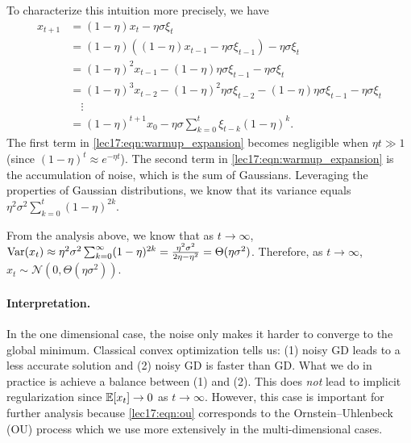 To characterize this intuition more precisely, we have 
\begin{align}
x_{t+1} &= (1 - \eta)x_t - \eta\sigma\xi_t\\
&= (1 - \eta) ((1 - \eta) x_{t - 1}  - \eta \sigma \xi_{t - 1}) - \eta \sigma \xi_t \\
&= (1 - \eta)^2 x_{t - 1} - (1 - \eta) \eta \sigma \xi_{t - 1} - \eta \sigma \xi_{t} \\
&= (1 - \eta)^3 x_{t - 2} - (1 - \eta)^2 \eta \sigma \xi_{t - 2} - (1 - \eta) \eta \sigma \xi_{t - 1} - \eta \sigma \xi_t \\
&\quad \vdots \\
&= (1 - \eta)^{t+1} x_0 - \eta\sigma\sum_{k=0}^{t} \xi_{t-k} (1 - \eta)^{k}. \label{lec17:eqn:warmup_expansion}
\end{align}
The first term in \eqref{lec17:eqn:warmup_expansion} becomes negligible when $\eta t \gg 1$ (since $(1 - \eta)^{t} \approx e^{-\eta t}$). The second term in \eqref{lec17:eqn:warmup_expansion} is the accumulation of noise, which is the sum of Gaussians. Leveraging the properties of Gaussian distributions, we know that its variance equals $\eta^2\sigma^2\sum_{k=0}^{t} (1 - \eta)^{2k}$.

From the analysis above, we know that as $t \rightarrow \infty$, $\operatorname{Var}(x_t) \approx \eta^2\sigma^2\sum_{k=0}^{\infty} (1 - \eta)^{2k} = \frac{\eta^2\sigma^2}{2\eta - \eta^2} = {\Theta}(\eta\sigma^2)$. Therefore, as $t \rightarrow \infty$, $x_t \sim \mathcal{N}(0, {\Theta}(\eta\sigma^2))$.

\paragraph{Interpretation.} In the one dimensional case, the noise only makes it harder to converge to the global minimum. Classical convex optimization tells us: (1) noisy GD leads to a less accurate solution and (2) noisy GD is faster than GD. What we do in practice is achieve a balance between (1) and (2). This does \textit{not} lead to implicit regularization since $\operatorname*{\mathbb{E}}[x_t] \rightarrow 0$ as $t \rightarrow \infty$. However, this case is important for further analysis because \eqref{lec17:eqn:ou} corresponds to the Ornstein–Uhlenbeck (OU) process which we use more extensively in the multi-dimensional cases.

